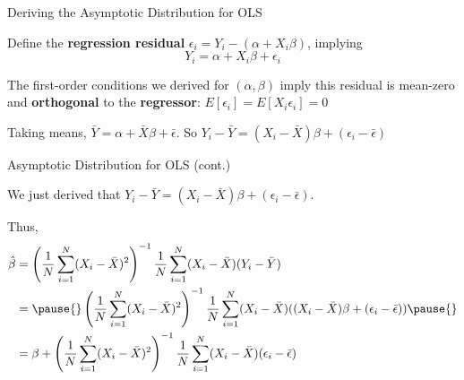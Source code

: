 \documentclass[11pt,english,handout]{beamer}
\newenvironment{wideitemize}{\itemize\addtolength{\itemsep}{10pt}}{\enditemize}
\begin{document}
\begin{frame}{Deriving the Asymptotic Distribution for OLS}
\begin{wideitemize}

\item
Define the \textbf{regression residual} $\epsilon_i = Y_i - (\alpha+X_i \beta)$, implying
\begin{equation*}
Y_i = \alpha + X_i \beta + \epsilon_i	
\end{equation*}

\pause
\item
The first-order conditions we derived for $(\alpha,\beta)$ imply this residual is mean-zero and \textbf{orthogonal} to the \textbf{regressor}: $E[\epsilon_i] = E[X_i \epsilon_i] =0$

\pause
\item
Taking means, $\bar{Y} = \alpha + \bar{X} \beta + \bar{\epsilon}$. \pause So $Y_i - \bar{Y} = (X_i - \bar{X})\beta + (\epsilon_i-\bar\epsilon)$

\end{wideitemize}

\end{frame}

\begin{frame}{Asymptotic Distribution for OLS (cont.)}
	\begin{wideitemize}
		
		\item
		We just derived that $Y_i - \bar{Y} = (X_i - \bar{X})\beta + (\epsilon_i-\bar\epsilon)$. 
		
		\item
		Thus,
		\begin{align*}
			\hat\beta &=\left( \frac{1}{N} \sum_{i=1}^N (X_i - \bar{X})^2 \right)^{-1}   \frac{1}{N} \sum_{i=1}^{N} (X_i - \bar{X})(Y_i - \bar{Y})   \\
			&=\pause{} \left( \frac{1}{N} \sum_{i=1}^N (X_i - \bar{X})^2 \right)^{-1}   \frac{1}{N} \sum_{i=1}^{N} (X_i - \bar{X})((X_i - \bar{X})\beta + (\epsilon_i-\bar\epsilon) ) \pause{} \\
			& =\beta + \left( \frac{1}{N} \sum_{i=1}^N (X_i - \bar{X})^2 \right)^{-1}   \frac{1}{N} \sum_{i=1}^{N} (X_i - \bar{X}) (\epsilon_i - \bar\epsilon)
		\end{align*}
\end{wideitemize}	
\end{frame}
\end{document}
